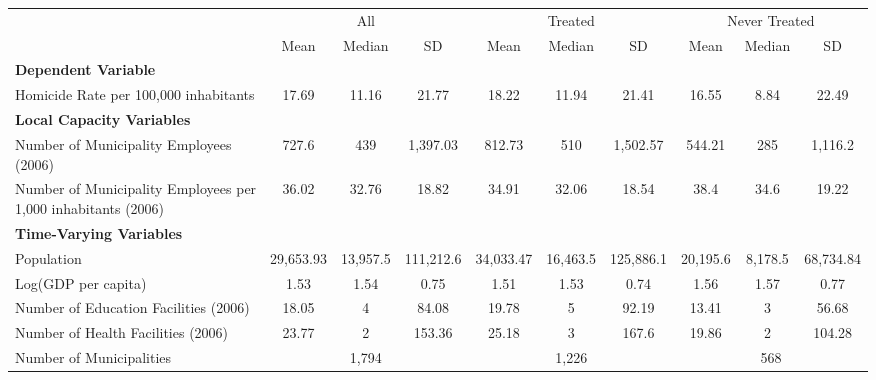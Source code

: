 \documentclass{article}
\begin{document}
\begin{table}[!htbp]
\centering
\begin{adjustbox}{max width=\textwidth}
\begin{tabular}{lccccccccc}
\toprule
& \multicolumn{3}{c}{All} & \multicolumn{3}{c}{Treated} & \multicolumn{3}{c}{Never Treated} \\
\cmidrule(lr){2-4} \cmidrule(lr){5-7} \cmidrule(lr){8-10}
& Mean & Median & SD & Mean & Median & SD & Mean & Median & SD \\
\midrule
\multicolumn{10}{l}{\textbf{Dependent Variable}} \\
Homicide Rate per 100,000 inhabitants & 17.69 & 11.16 & 21.77 & 18.22 & 11.94 & 21.41 & 16.55 & 8.84 & 22.49 \\[0.5em]
\midrule
\multicolumn{10}{l}{\textbf{Local Capacity Variables}} \\
Number of Municipality Employees (2006) & 727.6 & 439 & 1,397.03 & 812.73 & 510 & 1,502.57 & 544.21 & 285 & 1,116.2 \\
Number of Municipality Employees per 1,000 inhabitants (2006) & 36.02 & 32.76 & 18.82 & 34.91 & 32.06 & 18.54 & 38.4 & 34.6 & 19.22 \\[0.5em]
\midrule
\multicolumn{10}{l}{\textbf{Time-Varying Variables}} \\
Population & 29,653.93 & 13,957.5 & 111,212.6 & 34,033.47 & 16,463.5 & 125,886.1 & 20,195.6 & 8,178.5 & 68,734.84 \\
Log(GDP per capita) & 1.53 & 1.54 & 0.75 & 1.51 & 1.53 & 0.74 & 1.56 & 1.57 & 0.77 \\
Number of Education Facilities (2006) & 18.05 & 4 & 84.08 & 19.78 & 5 & 92.19 & 13.41 & 3 & 56.68 \\
Number of Health Facilities (2006) & 23.77 & 2 & 153.36 & 25.18 & 3 & 167.6 & 19.86 & 2 & 104.28 \\
\midrule
Number of Municipalities & \multicolumn{3}{c}{1,794} & \multicolumn{3}{c}{1,226} & \multicolumn{3}{c}{568} \\
\bottomrule
\end{tabular}
\end{adjustbox}
\end{table}
\end{document}
